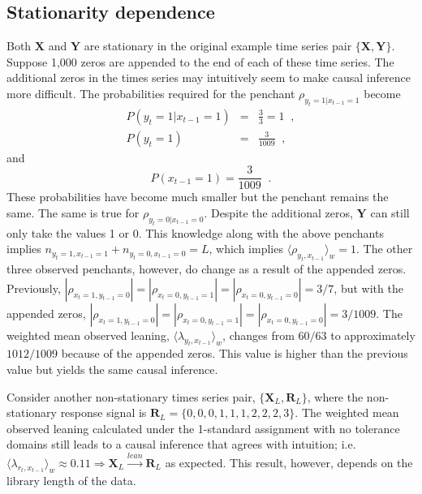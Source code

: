 \documentclass[twocolumn,aps,pre,groupedaddress]{revtex4-1}
\begin{document}
\subsection{Stationarity dependence}
Both $\mathbf{X}$ and $\mathbf{Y}$ are stationary in the original example time series pair $\{\mathbf{X},\mathbf{Y}\}$.  Suppose 1,000 zeros are appended to the end of each of these time series.  The additional zeros in the times series may intuitively seem to make causal inference more difficult.  The probabilities required for the penchant $\rho_{y_t=1|x_{t-1}=1}$ become
\begin{eqnarray*}
P\left( y_t = 1 | x_{t-1} = 1\right) &=& \frac{3}{3} = 1\;\;,\\
P\left( y_t = 1\right) &=& \frac{3}{1009}\;\;,
\end{eqnarray*}
and
\begin{equation*}
P\left( x_{t-1} = 1\right) = \frac{3}{1009}\;\;.
\end{equation*}
These probabilities have become much smaller but the penchant remains the same.  The same is true for $\rho_{y_t=0|x_{t-1}=0}$.  Despite the additional zeros, $\mathbf{Y}$ can still only take the values 1 or 0.  This knowledge along with the above penchants implies $n_{y_t=1,x_{t-1}=1}+n_{y_t=0,x_{t-1}=0}=L$, which implies $\langle \rho_{y_t,x_{t-1}} \rangle_w = 1$.  The other three observed penchants, however, do change as a result of the appended zeros.  Previously, $|\rho_{x_t=1,y_{t-1}=0}| = |\rho_{x_t=0,y_{t-1}=1}| = |\rho_{x_t=0,y_{t-1}=0}| = 3/7$, but with the appended zeros, $|\rho_{x_t=1,y_{t-1}=0}| = |\rho_{x_t=0,y_{t-1}=1}| = |\rho_{x_t=0,y_{t-1}=0}| = 3/1009$.  The weighted mean observed leaning, $\langle \lambda_{y_t,x_{t-1}} \rangle_w$, changes from $60/63$ to approximately $1012/1009$ because of the appended zeros.  This value is higher than the previous value but yields the same causal inference.  

Consider another non-stationary times series pair, $\{\mathbf{X}_L,\mathbf{R}_L\}$, where the non-stationary response signal is $\mathbf{R}_L = \{0,0,0,1,1,1,2,2,2,3\}$.  The weighted mean observed leaning calculated under the 1-standard assignment with no tolerance domains still leads to a causal inference that agrees with intuition; i.e.\ $\langle \lambda_{r_t,x_{t-1}} \rangle_w \approx 0.11 \Rightarrow \mathbf{X}_L\xrightarrow{lean}\mathbf{R}_L$ as expected.  This result, however, depends on the library length of the data.
\end{document}

